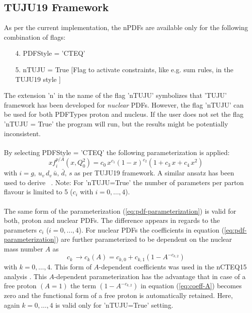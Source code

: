 \documentclass{article}
\begin{document}
\subsection{TUJU19 Framework}
\label{sec-tuju19}

As per the current implementation, the nPDFs are available only for the following combination of flags:
\begin{enumerate}
\item[4.] PDFStyle = 'CTEQ'
\item[5.] nTUJU = True [Flag to activate constraints, like e.g. sum rules, in the TUJU19 style \cite{Walt:2019slu}]
\end{enumerate}

\noindent The extension 'n' in the name of the flag 'nTUJU' symbolizes that 'TUJU' framework has been developed for \textit{nuclear} PDFs. However, the flag 'nTUJU' can be used for both PDFTypes proton and nucleus. If the user does not set the flag 'nTUJU = True' the program will run, but the results might be potentially inconsistent. \\
\\
By selecting PDFStyle = 'CTEQ' the following parameterization is applied:
\begin{equation}
xf^{p/A}_i\left(x,Q_0^2 \right) = c_0\,x^{c_1} (1-x)^{c_2} \left(1+c_3\,x + c_4\,x^2 \right)
\label{eq:pdf-parameterization}
\end{equation}
with $i=g,\,u_v\,d_v\,\bar{u},\,\bar{d},\,s$ as per TUJU19 framework. A similar ansatz has been used to derive ~\cite{Abramowicz:2015mha}. Note: For 'nTUJU=True' the number of parameters per parton flavour is limited to 5 ($c_i$ with $i=0,...,4$).\\
\\
The same form of the parameterization (\ref{eq:pdf-parameterization}) is valid for both, proton and nuclear PDFs. The difference appears in regards to the parameters $c_i$ ($i=0,...,4$). For nuclear PDFs the coefficients in equation (\ref{eq:pdf-parameterization}) are further parameterized to be dependent on the nuclear mass number $A$ as
\begin{equation}
c_k\,\rightarrow c_k(A) = c_{k,0}+c_{k,1}\left( 1 - A^{-c_{k,2}} \right)
\label{eq:coeff-A}
\end{equation}
with $k={0,\dots,4}$. This form of $A$-dependent coefficients was used in the nCTEQ15 analysis \cite{Kovarik:2015cma}. This $A$-dependent parameterization has the advantage that in case of a free proton $(A=1)$ the term $\left( 1 - A^{-c_{k,2}} \right)$ in equation (\ref{eq:coeff-A}) becomes zero and the functional form of a free proton is automatically retained. Here, again $k={0,\dots,4}$ is valid only for 'nTUJU=True' setting.\\
\end{document}
